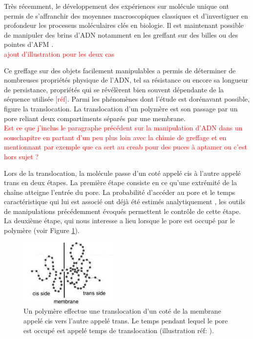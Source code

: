 \documentclass[a4paper,11pt]{article}
\begin{document}
Très récemment, le développement des expériences sur molécule unique ont permis de s'affranchir des moyennes macroscopiques classiques et d'investiguer en profondeur les processus moléculaires clés en biologie. Il est maintenant possible de manipuler des brins d'ADN notamment en les greffant sur des billes ou des pointes d'AFM \cite{keyser}.\\

\textcolor{red}{ajout d'illustration pour les deux cas}

Ce greffage sur des objets facilement manipulables a permis de déterminer de nombreuses propriétés physique de l'ADN, tel sa résistance ou encore sa longueur de persistance, propriétés qui se révélèrent bien souvent dépendante de la séquence utilisée \textcolor{red}{[réf]}. Parmi les phénomènes dont l'étude est dorénavant possible, figure la translocation. La translocation d'un polymère est son passage par un pore reliant deux compartiments séparés par une membrane.\\

\textcolor{red}{Est ce que j'inclus le paragraphe précédent sur la manipulation d'ADN dans un souschapitre en partant d'un peu plus loin avec la chimie de greffage et en mentionnant par exemple que ca sert au creab pour des puces à aptamer ou c'est hors sujet ?}

 Lors de la translocation, la molécule passe d'un coté appelé cis à l'autre appelé trans en deux étapes. La première étape consiste en ce qu'une extrémité de la chaîne atteigne l'entrée du pore. La probabilité d'accéder au pore et le temps caractéristique qui lui est associé ont déjà été estimés analytiquement \cite{milchev}, les outils de manipulations précédemment évoqués permettent le contr\^{o}le  de cette étape. La deuxième étape, qui nous interesse a lieu lorsque le pore est occupé par le polymère (voir Figure \ref{transloc}). \\

\begin{figure}[H]
\begin{center}
\includegraphics[width=0.45\textwidth]{transloc.jpg}

\caption{Un polymère effectue une translocation d'un coté de la membrane appelé cis vers l'autre appelé trans. Le temps pendant lequel le pore est occupé est appelé temps de translocation (illustration réf: \cite{sung}).}
\label{transloc}
\end{center}
\end{figure}
\end{document}
